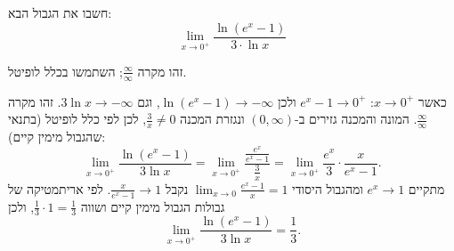 
\begin{question}
חשבו את הגבול הבא:
\[ \lim_{x\to0^+}\frac{\ln(e^x-1)}{3\cdot\ln x} \]
\end{question}

\begin{hint}
זהו מקרה $\frac{\infty}{\infty}$; השתמשו בכלל לופיטל.
\end{hint}

\begin{solution}
כאשר $x\to0^+$: $e^x-1\to0^+$ ולכן $\ln(e^x-1)\to-\infty$, וגם $3\ln x\to-\infty$. זהו מקרה $\frac{\infty}{\infty}$. המונה והמכנה גזירים ב-$(0,\infty)$ ונגזרת המכנה $\frac3x\neq0$, לכן לפי כלל לופיטל (בתנאי שהגבול מימין קיים):
\[ \lim_{x\to0^+}\frac{\ln(e^x-1)}{3\ln x}=\lim_{x\to0^+}\frac{\frac{e^x}{e^x-1}}{\frac3x}=\lim_{x\to0^+}\frac{e^x}{3}\cdot\frac{x}{e^x-1}. \]
מתקיים $e^x\to1$ ומהגבול היסודי $\lim_{x\to0}\frac{e^x-1}{x}=1$ נקבל $\frac{x}{e^x-1}\to1$. לפי אריתמטיקה של גבולות הגבול מימין קיים ושווה $\frac13\cdot1=\frac13$, ולכן
\[ \lim_{x\to0^+}\frac{\ln(e^x-1)}{3\ln x}=\boxed{\frac13}. \]
\end{solution}
